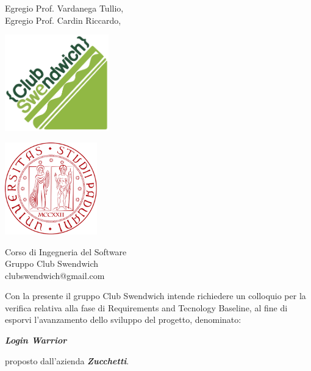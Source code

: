 \documentclass[a4paper, 12pt]{letter}
\begin{document}
    \begin{letter}
        { 	Egregio Prof. Vardanega Tullio,\\
        		Egregio Prof. Cardin Riccardo,}
        \begin{minipage}{.55\textwidth}
            \begin{center}
                \includegraphics[width=4.5cm]{../../assets/ClubSweLogo.png}
            \end{center}
        \end{minipage}
        \begin{minipage}{.3\textwidth}
            \begin{flushright}
                \includegraphics[width=4cm]{../../assets/logoUnipd.png}
            \end{flushright}
        \end{minipage}
        {    
        \begin{center}
            Corso di Ingegneria del Software\\ 
            Gruppo Club Swendwich\\ 
            clubswendwich@gmail.com
        \end{center}
        }
        \opening{ 
        		 Con la presente il gruppo Club Swendwich intende richiedere un colloquio per la verifica relativa alla fase di Requirements and Tecnology Baseline, al fine di esporvi l'avanzamento dello sviluppo del progetto, denominato:}
        \begin{center}
           \textbf{\textit{Login Warrior}} 
        \end{center}
        proposto dall'azienda \textbf{\textit{Zucchetti}}.\\

\end{letter}
\end{document}
